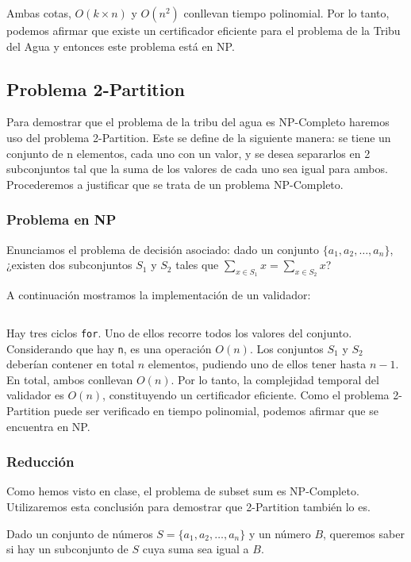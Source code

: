 \documentclass{article}
\begin{document}
Ambas cotas, $O(k \times n)$ y $O(n^2)$ conllevan tiempo polinomial. Por lo tanto, podemos afirmar que existe un certificador eficiente para el problema de la Tribu del Agua y entonces este problema está en NP.

\subsection{Problema 2-Partition}

Para demostrar que el problema de la tribu del agua es NP-Completo haremos uso del problema 2-Partition. Este se define de la siguiente manera: se tiene un conjunto de n elementos, cada uno con un valor, y se desea separarlos en 2 subconjuntos tal que la suma de los valores de cada uno sea igual para ambos. Procederemos a justificar que se trata de un problema NP-Completo.

\subsubsection{Problema en NP}
Enunciamos el problema de decisión asociado: dado un conjunto \( \{a_1, a_2, \ldots, a_n\} \), ¿existen dos subconjuntos \( S_1 \) y \( S_2 \) tales que \( \sum_{x \in S_1} x = \sum_{x \in S_2} x \)?

A continuación mostramos la implementación de un validador:
\inputminted[linenos]{python}{codigo/certificador_2_partition.py}

Hay tres ciclos \texttt{for}. Uno de ellos recorre todos los valores del conjunto. Considerando que hay \texttt{n}, es una operación $O(n)$. Los conjuntos $S_1$ y $S_2$ deberían contener en total $n$ elementos, pudiendo uno de ellos tener hasta  $n-1$. En total, ambos conllevan $O(n)$. Por lo tanto, la complejidad temporal del validador es $O(n)$, constituyendo un certificador eficiente. Como el problema 2-Partition puede ser verificado en tiempo polinomial, podemos afirmar que se encuentra en NP.

\subsubsection{Reducción}

Como hemos visto en clase, el problema de subset sum es NP-Completo. Utilizaremos esta conclusión para demostrar que 2-Partition también lo es.

Dado un conjunto de números \( S = \{a_1, a_2, \ldots, a_n\} \) y un número \( B \), queremos saber si hay un subconjunto de \( S \) cuya suma sea igual a \( B \).
\end{document}
